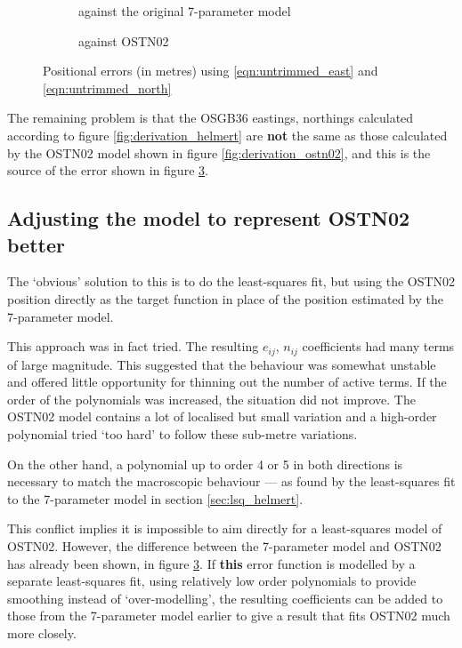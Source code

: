 \documentclass[10pt,a4paper]{article}
\def\tkname#1{}
\def\gap{\hspace{2cm}}
\begin{document}
\begin{figure}[htb]
  \begin{subfigure}[b]{0.4\textwidth}
    \tkname{untrimmed-v-7param}
  \centering
  \fbox{
    
  }
  \caption{against the original 7-parameter model}
  \label{fig:untrimmed_v_7param}
\end{subfigure}
\gap
  \begin{subfigure}[b]{0.4\textwidth}
    \tkname{untrimmed-v-ostn02}
  \centering
  \fbox{
    
  }
  \caption{against OSTN02}
  \label{fig:untrimmed_v_ostn02}
\end{subfigure}
  \caption{Positional errors (in metres) using \eqref{eqn:untrimmed_east} and \eqref{eqn:untrimmed_north}}
\hrulefill
\end{figure}

The remaining problem is that the OSGB36 eastings, northings calculated
according to figure \ref{fig:derivation_helmert} are \textbf{not} the same as
those calculated by the OSTN02 model shown in figure
\ref{fig:derivation_ostn02}, and this is the source of the error shown in
figure \ref{fig:untrimmed_v_ostn02}.

\subsection{Adjusting the model to represent OSTN02 better}

The `obvious' solution to this is to do the least-squares fit, but using the
OSTN02 position directly as the target function in place of the position
estimated by the 7-parameter model.

This approach was in fact tried.  The resulting $e_{ij}$, $n_{ij}$ coefficients
had many terms of large magnitude.  This suggested that the behaviour was
somewhat unstable and offered little opportunity for thinning out the number of
active terms.  If the order of the polynomials was increased, the situation did
not improve.  The OSTN02 model contains a lot of localised but small variation
and a high-order polynomial tried `too hard' to follow these sub-metre
variations.

On the other hand, a polynomial up to order 4 or 5 in both directions is
necessary to match the macroscopic behaviour --- as found by the least-squares
fit to the 7-parameter model in section \ref{sec:lsq_helmert}.

This conflict implies it is impossible to aim directly for a least-squares
model of OSTN02.  However, the difference between the 7-parameter model and
OSTN02 has already been shown, in figure \ref{fig:untrimmed_v_ostn02}.  If
\textbf{this} error function is modelled by a separate least-squares fit, using
relatively low order polynomials to provide smoothing instead of
`over-modelling', the resulting coefficients can be added to those from the
7-parameter model earlier to give a result that fits OSTN02 much more closely.
\end{document}
